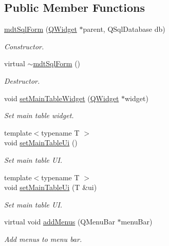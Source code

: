 \subsection*{Public Member Functions}
\begin{DoxyCompactItemize}
\item 
\hyperlink{classmdt_sql_form_a607993f0d35207668c0f220d77bd9298}{mdt\-Sql\-Form} (\hyperlink{class_q_widget}{Q\-Widget} $\ast$parent, Q\-Sql\-Database db)
\begin{DoxyCompactList}\small\item\em Constructor. \end{DoxyCompactList}\item 
virtual \hyperlink{classmdt_sql_form_ab4538979323566433a20bb71118525a5}{$\sim$mdt\-Sql\-Form} ()
\begin{DoxyCompactList}\small\item\em Destructor. \end{DoxyCompactList}\item 
void \hyperlink{classmdt_sql_form_ab1fee5cecde1e2faf4b4c1bf1ee672b1}{set\-Main\-Table\-Widget} (\hyperlink{class_q_widget}{Q\-Widget} $\ast$widget)
\begin{DoxyCompactList}\small\item\em Set main table widget. \end{DoxyCompactList}\item 
{\footnotesize template$<$typename T $>$ }\\void \hyperlink{classmdt_sql_form_ae3651d94b995dc84665f934ba9c7458f}{set\-Main\-Table\-Ui} ()
\begin{DoxyCompactList}\small\item\em Set main table U\-I. \end{DoxyCompactList}\item 
{\footnotesize template$<$typename T $>$ }\\void \hyperlink{classmdt_sql_form_ab4e3d6512a68eba681be79d1602b6d44}{set\-Main\-Table\-Ui} (T \&ui)
\begin{DoxyCompactList}\small\item\em Set main table U\-I. \end{DoxyCompactList}\item 
virtual void \hyperlink{classmdt_sql_form_a696cdbda10abab368ca9cbf1bbdd1bf1}{add\-Menus} (Q\-Menu\-Bar $\ast$menu\-Bar)
\begin{DoxyCompactList}\small\item\em Add menus to menu bar. \end{DoxyCompactList}\item 

\end{DoxyCompactItemize}
